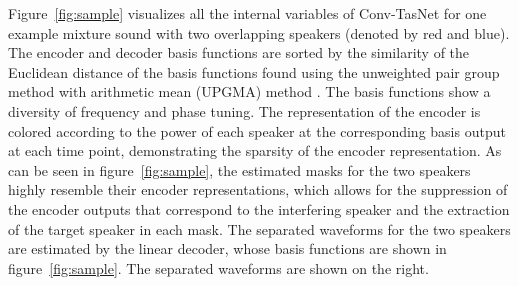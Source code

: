 \documentclass[journal]{IEEEtran}
\begin{document}
Figure~\ref{fig:sample} visualizes all the internal variables of Conv-TasNet for one example mixture sound with two overlapping speakers (denoted by red and blue). The encoder and decoder basis functions are sorted by the similarity of the Euclidean distance of the basis functions found using the unweighted pair group method with arithmetic mean (UPGMA) method \cite{sokal1958statistical}. The basis functions show a diversity of frequency and phase tuning. The representation of the encoder is colored according to the power of each speaker at the corresponding basis output at each time point, demonstrating the sparsity of the encoder representation. As can be seen in figure~\ref{fig:sample}, the estimated masks for the two speakers highly resemble their encoder representations, which allows for the suppression of the encoder outputs that correspond to the interfering speaker and the extraction of the target speaker in each mask. The separated waveforms for the two speakers are estimated by the linear decoder, whose basis functions are shown in figure~\ref{fig:sample}. The separated waveforms are shown on the right.  
\end{document}
